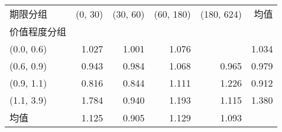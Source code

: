 \begin{tabular}{lrrrrr}
\toprule
期限分组 &  (0, 30) &  (30, 60) &  (60, 180) &  (180, 624) &  均值 \\
价值程度分组 &          &           &            &             &       \\
\midrule
(0.0, 0.6)    &    1.027 &     1.001 &      1.076 &             & 1.034 \\
(0.6, 0.9)    &    0.943 &     0.984 &      1.068 &       0.965 & 0.979 \\
(0.9, 1.1)    &    0.816 &     0.844 &      1.111 &       1.226 & 0.912 \\
(1.1, 3.9)    &    1.784 &     0.940 &      1.193 &       1.115 & 1.380 \\
均值          &    1.125 &     0.905 &      1.129 &       1.093 &       \\
\bottomrule
\end{tabular}
